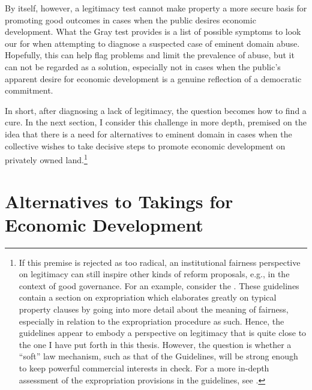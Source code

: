 By itself, however, a legitimacy test cannot make property a more secure basis for promoting good outcomes in cases when the public desires economic development. What the Gray test provides is a list of possible symptoms to look our for when attempting to diagnose a suspected case of eminent domain abuse. Hopefully, this can help flag problems and limit the prevalence of abuse, but it can not be regarded as a solution, especially not in cases when the public's apparent desire for economic development is a genuine reflection of a democratic commitment.

In short, after diagnosing a lack of legitimacy, the question becomes how to find a cure. In the next section, I consider this challenge in more depth, premised on the idea that there is a need for alternatives to eminent domain in cases when the collective wishes to take decisive steps to promote economic development on privately owned land.\footnote{If this premise is rejected as too radical, an institutional fairness perspective on legitimacy can still inspire other kinds of reform proposals, e.g., in the context of good governance. For an example, consider the \cite{guide12}. These guidelines contain a section on expropriation which elaborates greatly on typical property clauses by going into more detail about the meaning of fairness, especially in relation to the expropriation procedure as such. Hence, the guidelines appear to embody a perspective on legitimacy that is quite close to the one I have put forth in this thesis. However, the question is whether a ``soft'' law mechanism, such as that of the Guidelines, will be strong enough to keep powerful commercial interests in check. For a more in-depth assessment of the expropriation provisions in the guidelines, see \cite{hoops15}.}

\section{Alternatives to Takings for Economic Development}\label{sec:3:6}

